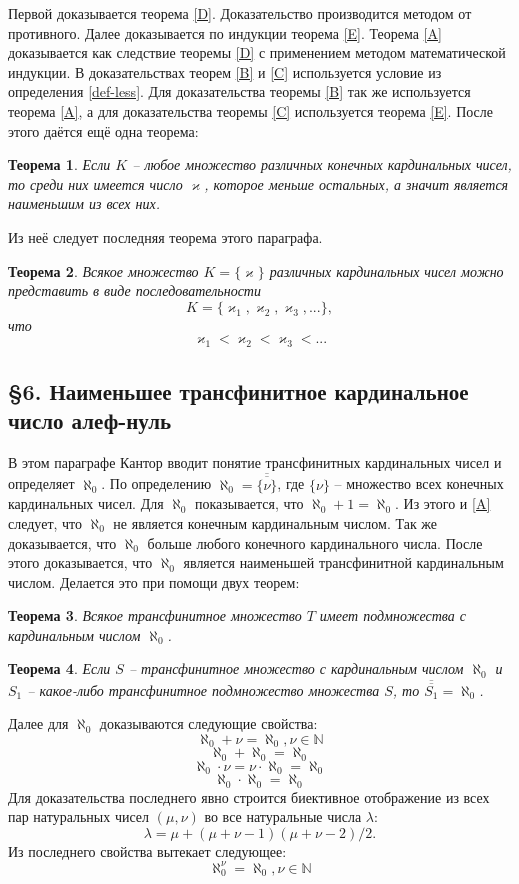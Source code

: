 \documentclass[a4paper,12pt]{extarticle}
\newtheorem{theorem}{Теорема}[subsection]
\theoremstyle{definition}
\newcommand{\car}[1]{\overline{\overline{#1}}}
\begin{document}
Первой доказывается теорема \ref{D}.
Доказательство производится методом от противного.
Далее доказывается по индукции теорема \ref{E}.
Теорема \ref{A} доказывается как следствие теоремы \ref{D} с применением методом математической индукции.
В доказательствах теорем \ref{B} и \ref{C} используется условие из определения \ref{def-less}.
Для доказательства теоремы \ref{B} так же используется теорема \ref{A}, а для доказательства теоремы \ref{C} используется теорема \ref{E}.
После этого даётся ещё одна теорема:
\begin{theorem}
\label{F}
Если $K$ -- любое множество различных конечных кардинальных чисел, то среди них имеется число $\varkappa$, которое меньше остальных, а значит является наименьшим из всех них.
\end{theorem}
Из неё следует последняя теорема этого параграфа.
\begin{theorem}
\label{G}
    Всякое множество $K = \{\varkappa\}$ различных кардинальных чисел можно представить в виде последовательности 
    $$K = \{\varkappa_1, \varkappa_2, \varkappa_3, ...\},$$ что $$\varkappa_1 < \varkappa_2 < \varkappa_3 < ...$$
\end{theorem}

\subsection{\S 6. Наименьшее трансфинитное кардинальное число алеф-нуль}
В этом параграфе Кантор вводит понятие трансфинитных кардинальных чисел и определяет $\aleph_0$.
По определению $\aleph_0 = \car{\{\nu\}}$, где $\{\nu\}$ -- множество всех конечных кардинальных чисел.
Для $\aleph_0$ показывается, что $\aleph_0 + 1 = \aleph_0$.
Из этого и \ref{A} следует, что $\aleph_0$ не является конечным кардинальным числом.
Так же доказывается, что $\aleph_0$ больше любого конечного кардинального числа.
После этого доказывается, что $\aleph_0$ является наименьшей трансфинитной кардинальным числом.
Делается это при помощи двух теорем:
\begin{theorem}
    Всякое трансфинитное множество $T$ имеет подмножества с кардинальным числом $\aleph_0$.
\end{theorem}
\begin{theorem}
    Если $S$ -- трансфинитное множество с кардинальным числом $\aleph_0$ и $S_1$ -- какое-либо трансфинитное подмножество множества $S$, то $\car{S_1} = \aleph_0$.
\end{theorem}

Далее для $\aleph_0$ доказываются следующие свойства:
$$ \aleph_0 + \nu = \aleph_0, \nu \in \mathbb{N} $$
$$ \aleph_0 + \aleph_0 = \aleph_0 $$
$$ \aleph_0 \cdot \nu = \nu \cdot \aleph_0 = \aleph_0 $$
$$ \aleph_0 \cdot \aleph_0 = \aleph_0 $$
Для доказательства последнего явно строится биективное отображение из всех пар натуральных чисел $(\mu, \nu)$ во все натуральные числа $\lambda$:
$$ \lambda = \mu + (\mu + \nu - 1)(\mu + \nu - 2)/2. $$
Из последнего свойства вытекает следующее:
$$ \aleph_0^{\nu} = \aleph_0, \nu \in \mathbb{N} $$
\end{document}
